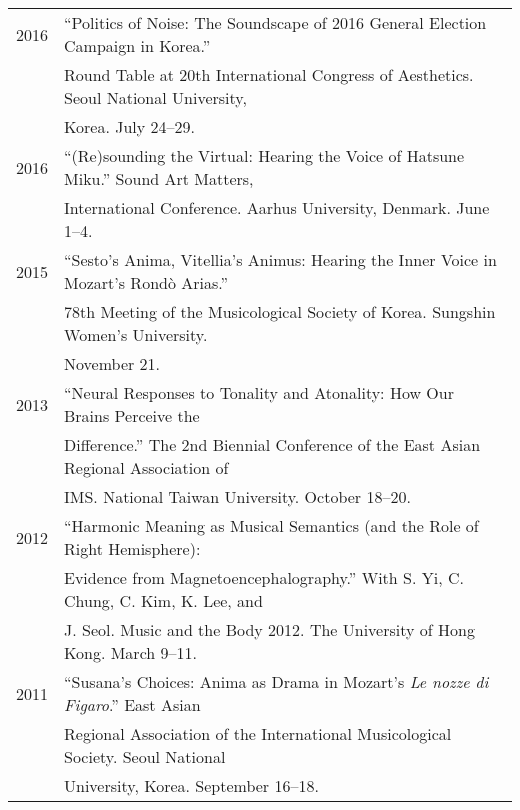 \documentclass[a4paper,11pt]{article}
\begin{document}
\begin{tabular}{p{2.5cm} p{12.5cm}}
    2016 & “Politics of Noise: The Soundscape of 2016 General Election Campaign
    in Korea.”\\
    & Round Table at 20th International Congress of Aesthetics. Seoul National
    University,\\
    & Korea. July 24--29.\\[2mm]
  
    2016 & “(Re)sounding the Virtual: Hearing the Voice of Hatsune Miku.” Sound
    Art Matters,\\
    & International Conference. Aarhus University, Denmark. June 1--4.\\[2mm]
  
    2015 & “Sesto’s Anima, Vitellia’s Animus: Hearing the Inner Voice in
    Mozart’s Rond\`{o} Arias.”\\
    & 78th Meeting of the Musicological Society of Korea. Sungshin Women’s
    University.\\
    & November 21.\\[2mm]
  
    2013 & “Neural Responses to Tonality and Atonality: How Our Brains Perceive
    the\\
    & Difference.” The 2nd Biennial Conference of the East Asian Regional
    Association of\\
    & IMS. National Taiwan University. October 18–20.\\[2mm]
    
    
    2012 & “Harmonic Meaning as Musical Semantics (and the Role of Right
    Hemisphere):\\
    & Evidence from Magnetoencephalography.” With S. Yi, C. Chung, C. Kim, K.
    Lee, and\\
    & J. Seol. Music and the Body 2012. The University of Hong Kong. March
    9–11.\\[2mm]
    
    2011 & “Susana’s Choices: Anima as Drama in Mozart’s \textit{Le nozze di
    Figaro}.” East Asian\\
    & Regional Association of the International Musicological Society. Seoul
    National\\
    & University, Korea. September 16–18.
    
  \end{tabular}
  
\end{document}
